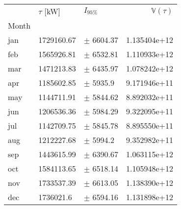 \begin{tabular}{lllr}
\toprule
{} & $\tau$ [kW] &      $I_{95\%}$ &  $\mathbb{V}(\tau)$ \\
Month &             &                 &                     \\
\midrule
jan   &  1729160.67 &   $\pm$ 6604.37 &        1.135404e+12 \\
feb   &  1565926.81 &   $\pm$ 6532.81 &        1.110933e+12 \\
mar   &  1471213.83 &   $\pm$ 6435.97 &        1.078242e+12 \\
apr   &  1185602.85 &    $\pm$ 5935.9 &        9.171946e+11 \\
may   &  1144711.91 &   $\pm$ 5844.62 &        8.892032e+11 \\
jun   &  1206536.36 &   $\pm$ 5984.29 &        9.322095e+11 \\
jul   &  1142709.75 &   $\pm$ 5845.78 &        8.895550e+11 \\
aug   &  1212227.68 &    $\pm$ 5994.2 &        9.352982e+11 \\
sep   &  1443615.99 &   $\pm$ 6390.67 &        1.063115e+12 \\
oct   &  1584113.65 &   $\pm$ 6518.14 &        1.105948e+12 \\
nov   &  1733537.39 &   $\pm$ 6613.05 &        1.138390e+12 \\
dec   &   1736021.6 &   $\pm$ 6594.16 &        1.131898e+12 \\
\bottomrule
\end{tabular}
